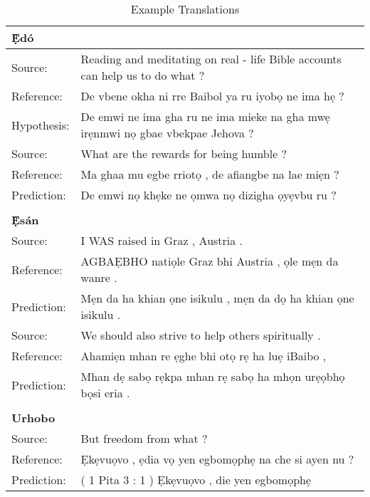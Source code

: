 \documentclass{article} %
\begin{document}
\begin{table}[h]
\caption{Example Translations}
\label{results}
\begin{center}
  \begin{tabular}{ll}
     \textbf{\d{\`E}d{\'o}}  & \\
     \midrule
     \midrule
     Source:   &  Reading and meditating on real - life Bible accounts can help us to do what ?  \\
Reference: & De vbene okha ni rre Baibol ya ru iyob\d{o} ne ima h\d{e} ?  \\
Hypothesis: & De emwi ne ima gha ru ne ima mieke na gha mw\d{e} ir\d{e}nmwi n\d{o} gbae vbekpae Jehova ?  \\
     \midrule
	Source:   &    What are the rewards for being humble ? \\
	Reference:  &  Ma ghaa mu egbe rriot\d{o} , de afiangbe na lae mi\d{e}n ? \\
	Prediction:  & De emwi n\d{o} kh\d{e}ke ne \d{o}mwa n\d{o} dizigha \d{o}y\d{e}vbu ru ? \\
	 \bottomrule
     \\
    \textbf{\d{\`E}s{\'a}n}  & \\
     \midrule
     \midrule
	Source:      &  I WAS raised in Graz , Austria . \\
	Reference:    & AGBA\d{E}BHO nati\d{o}le Graz bhi Austria , \d{o}le m\d{e}n da wanre . \\
	Prediction:   & M\d{e}n da ha khian \d{o}ne isikulu , m\d{e}n da d\d{o} ha khian \d{o}ne isikulu . \\
     \midrule
     Source:    &   We should also strive to help others spiritually . \\
	 Reference:  &  Ahami\d{e}n mhan re \d{e}ghe bhi ot\d{o} r\d{e} ha lu\d{e} iBaibo , \\
	 Prediction:  &  Mhan d\d{e} sab\d{o} r\d{e}kpa mhan r\d{e} sab\d{o} ha mh\d{o}n ur\d{e}\d{o}bh\d{o} b\d{o}si eria . \\
	 \bottomrule
	\\
    \textbf{Urhobo}  & \\
     \midrule
     \midrule
	Source:    &                   But freedom from what ? \\
	Reference: &  		   Ẹk\d{e}vu\d{o}vo , \d{e}dia v\d{o} yen egbomọph\d{e} na che si ayen nu ? \\
	Prediction: & ( 1 Pita 3 : 1 ) Ẹk\d{e}vu\d{o}vo , die yen egbom\d{o}ph\d{e}  \\
     \midrule


\end{tabular}
\end{center}
\end{table}
\end{document}

